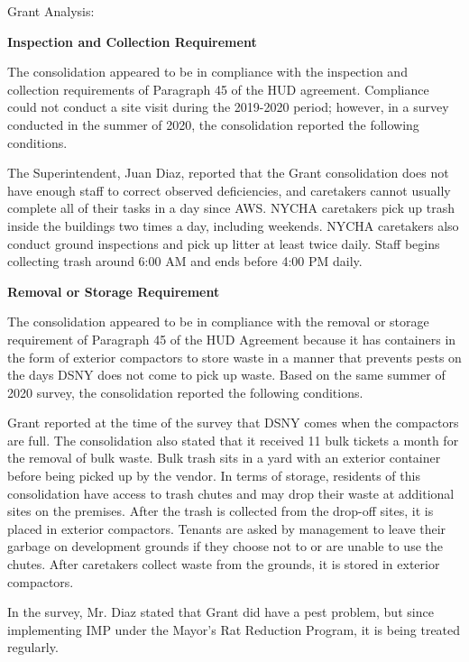 Grant Analysis: 

\textbf{Inspection and Collection Requirement} 

 

The consolidation appeared to be in compliance with the inspection and collection requirements of Paragraph 45 of the HUD agreement. Compliance could not conduct a site visit during the 2019-2020 period; however, in a survey conducted in the summer of 2020, the consolidation reported the following conditions. 

The Superintendent, Juan Diaz, reported that the Grant consolidation does not have enough staff to correct observed deficiencies, and caretakers cannot usually complete all of their tasks in a day since AWS. NYCHA caretakers pick up trash inside the buildings two times a day, including weekends. NYCHA caretakers also conduct ground inspections and pick up litter at least twice daily. Staff begins collecting trash around 6:00 AM and ends before 4:00 PM daily.

\textbf{Removal or Storage Requirement} 

The consolidation appeared to be in compliance with the removal or storage requirement of Paragraph  45 of the HUD Agreement because it has containers in the form of exterior compactors to store waste in a manner that prevents pests on the days DSNY does not come to pick up waste. Based on the same summer of  2020 survey, the consolidation reported the following conditions.

 

Grant reported at the time of the survey that DSNY comes when the compactors are full. The consolidation also stated that it received 11 bulk tickets a month for the removal of bulk waste.  Bulk trash sits in a yard with an exterior container before being picked up by the vendor. In terms of storage, residents of this consolidation have access to trash chutes and may drop their waste at additional sites on the premises. After the trash is collected from the drop-off sites, it is placed in exterior compactors. Tenants are asked by management to leave their garbage on development grounds if they choose not to or are unable to use the chutes. After caretakers collect waste from the grounds, it is stored in exterior compactors. 

 

In the survey, Mr. Diaz stated that Grant did have a pest problem, but since implementing IMP under the Mayor's Rat Reduction Program, it is being treated regularly. 

